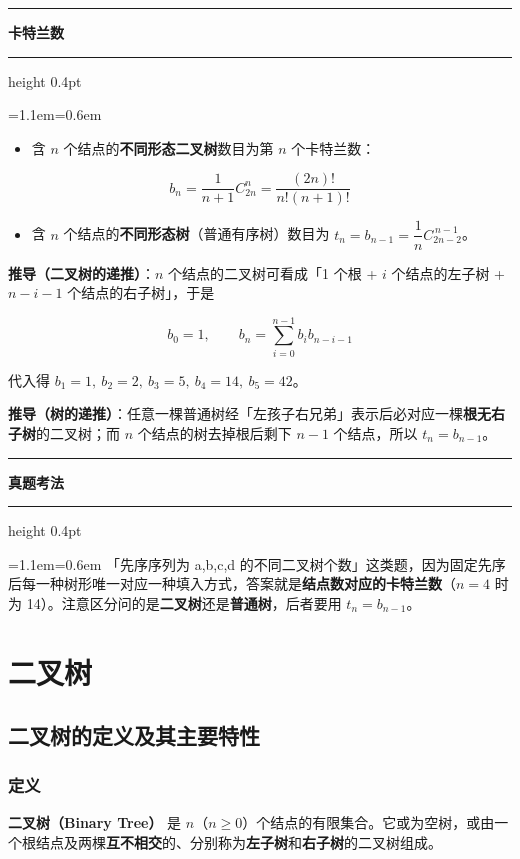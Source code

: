 \documentclass[11pt,openany,UTF8]{ctexbook}
\newcommand{\callouthead}[2]{%
  \par\addvspace{7pt}\noindent
  {\color{#1}\rule[-0.15em]{3pt}{1.05em}}\hspace{0.5em}%
  {\bfseries\color{#1}#2}\par\nobreak\vspace{-0.35em}%
  {\color{rulesep}\hrule height 0.4pt}\nobreak\vspace{0.45em}%
  \begingroup\small\setlength{\parindent}{0pt}%
  \leftskip=1.1em\rightskip=0.6em\noindent\ignorespaces}
\newcommand{\calloutend}{\par\endgroup\addvspace{7pt}}
\newenvironment{callkey}[1]{\callouthead{keybar}{#1}}{\calloutend}
\newenvironment{callexam}[1]{\callouthead{exambar}{#1}}{\calloutend}
\begin{document}
\begin{callkey}{卡特兰数}
\begin{itemize}
\item 含 $n$ 个结点的\textbf{不同形态二叉树}数目为第 $n$ 个卡特兰数：
\end{itemize}
\[b_n=\frac{1}{n+1}C_{2n}^{n}=\frac{(2n)!}{n!(n+1)!}\]

\begin{itemize}
\item 含 $n$ 个结点的\textbf{不同形态树}（普通有序树）数目为 $t_n=b_{n-1}=\dfrac{1}{n}C_{2n-2}^{\,n-1}$。
\end{itemize}
\textbf{推导（二叉树的递推）}：$n$ 个结点的二叉树可看成「1 个根 + $i$ 个结点的左子树 + $n-i-1$ 个结点的右子树」，于是

\[b_0=1,\qquad b_n=\sum_{i=0}^{n-1}b_i b_{n-i-1}\]

代入得 $b_1=1,\ b_2=2,\ b_3=5,\ b_4=14,\ b_5=42$。

\textbf{推导（树的递推）}：任意一棵普通树经「左孩子右兄弟」表示后必对应一棵\textbf{根无右子树}的二叉树；而 $n$ 个结点的树去掉根后剩下 $n-1$ 个结点，所以 $t_n=b_{n-1}$。

\end{callkey}

\begin{callexam}{真题考法}
「先序序列为 a,b,c,d 的不同二叉树个数」这类题，因为固定先序后每一种树形唯一对应一种填入方式，答案就是\textbf{结点数对应的卡特兰数}（$n=4$ 时为 14）。注意区分问的是\textbf{二叉树}还是\textbf{普通树}，后者要用 $t_n=b_{n-1}$。

\end{callexam}

\section{二叉树}

\subsection{二叉树的定义及其主要特性}

\subsubsection{定义}

\textbf{二叉树（Binary Tree）} 是 $n$（$n\ge0$）个结点的有限集合。它或为空树，或由一个根结点及两棵\textbf{互不相交}的、分别称为\textbf{左子树}和\textbf{右子树}的二叉树组成。
\end{document}
